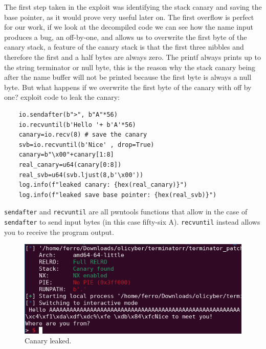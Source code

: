     The first step taken in the exploit was identifying the stack canary and saving the base pointer, as it would prove very useful later on.\newline
    The first overflow is perfect for our work, if we look at the decompiled code we can see how the name input produces a bug, an off-by-one, and allows us to overwrite the first byte of the canary stack, a feature of the canary stack is that the first three nibbles and therefore the first and a half bytes are always zero.\newline
    The printf always prints up to the string terminator or null byte, this is the reason why the stack canary being after the name buffer will not be printed because the first byte is always a null byte.\newline
    But what happens if we overwrite the first byte of the canary with off by one?\newline
    exploit code to leak the canary:
    \begin{verbatim} 
    io.sendafter(b">", b"A"*56) 
    io.recvuntil(b'Hello '+ b'A'*56) 
    canary=io.recv(8) # save the canary  
    svb=io.recvuntil(b'Nice' , drop=True) 
    canary=b"\x00"+canary[1:8] 
    real_canary=u64(canary[0:8])
    real_svb=u64(svb.ljust(8,b'\x00'))
    log.info(f"leaked canary: {hex(real_canary)}")
    log.info(f"leaked save base pointer: {hex(real_svb)}")
    \end{verbatim}
    \texttt{sendafter} and \texttt{recvuntil} are all pwntools functions that allow in the case of \texttt{sendafter} to send input bytes (in this case fifty-six A).\newline
    \texttt{recvuntil} instead allows you to receive the program output.\newline
    \begin{figure}[htbp]
        \centering
        \includegraphics[width=1\linewidth]{Images/leaked_canary_terminator.png}
        \caption{Canary leaked.}
        \label{fig:leaked_terminator_canary}
    \end{figure}
